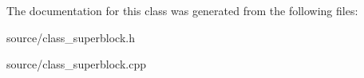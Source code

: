 The documentation for this class was generated from the following files\+:\begin{DoxyCompactItemize}
\item 
source/class\+\_\+superblock.\+h\item 
source/class\+\_\+superblock.\+cpp\end{DoxyCompactItemize}
